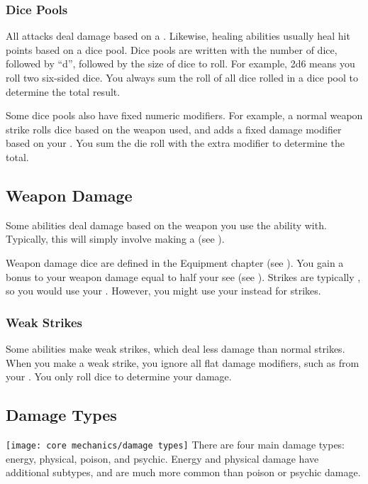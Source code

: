         \subsubsection{Dice Pools}\label{Dice Pools}
            All attacks deal damage based on a .
            Likewise, healing abilities usually heal hit points based on a dice pool.
            Dice pools are written with the number of dice, followed by ``d'', followed by the size of dice to roll.
            For example, 2d6 means you roll two six-sided dice.
            You always sum the roll of all dice rolled in a dice pool to determine the total result.

            Some dice pools also have fixed numeric modifiers.
            For example, a normal weapon strike rolls dice based on the weapon used, and adds a fixed damage modifier based on your .
            You sum the die roll with the extra modifier to determine the total.

    \subsection{Weapon Damage}\label{Weapon Damage}
        Some abilities deal damage based on the weapon you use the ability with.
        Typically, this will simply involve making a  (see ).

        Weapon damage dice are defined in the Equipment chapter (see ).
        You gain a bonus to your weapon damage equal to half your  see (see ).
        Strikes are typically , so you would use your .
        However, you might use your  instead for \magical strikes.

        \subsubsection{Weak Strikes}
            Some abilities make weak strikes, which deal less damage than normal strikes.
            When you make a weak strike, you ignore all flat damage modifiers, such as from your .
            You only roll dice to determine your damage.

    \subsection{Damage Types}\label{Damage Types}
        \texttt{[image: core mechanics/damage types]}
        There are four main damage types: energy, physical, poison, and psychic.
        Energy and physical damage have additional subtypes, and are much more common than poison or psychic damage.

